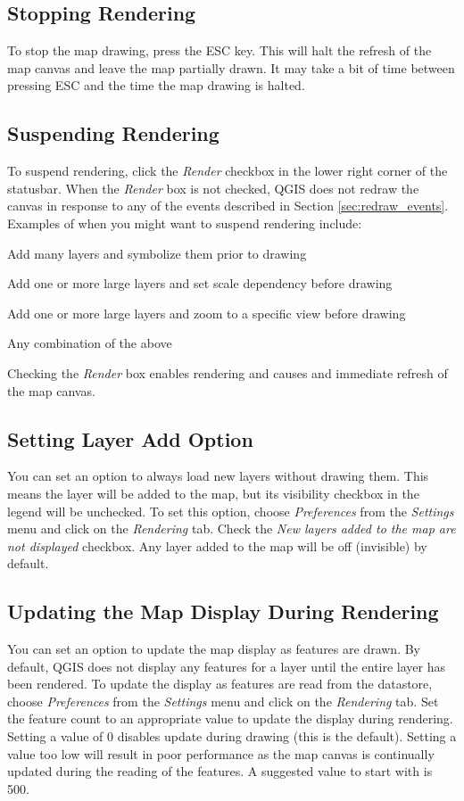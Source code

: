 \subsection{Stopping Rendering}
To stop the map drawing, press the ESC key. This will halt the refresh of the
map canvas and leave the map partially drawn. It may take a bit of time between
pressing ESC and the time the map drawing is halted.
\subsection{Suspending Rendering}
To suspend rendering, click the \textit{Render} checkbox in the lower right
corner of the statusbar. When the \textit{Render} box is not checked, QGIS does
not redraw the canvas in response to any of the events described in Section
\ref{sec:redraw_events}. Examples of when you might want to suspend rendering
include:
\begin{compactitem}
\item Add many layers and symbolize them prior to drawing
\item Add one or more large layers and set scale dependency before drawing
\item Add one or more large layers and zoom to a specific view before drawing
\item Any combination of the above
\end{compactitem}
Checking the \textit{Render} box enables rendering and causes and immediate
refresh of the map canvas.
\subsection{Setting Layer Add
Option}
You can set an option to always load new layers without drawing them. This means
the layer will be added to the map, but its visibility checkbox in the legend
will be unchecked. To set this option, choose \textit{Preferences} from the
\textit{Settings} menu and click on the \textit{Rendering} tab. Check the
\textit{New layers added to the map are not displayed} checkbox. Any layer added
to the map will be off (invisible) by default.
\subsection{Updating the Map Display During Rendering}
You can set an option to update the map display as features are drawn. By
default, QGIS does not display any features for a layer until the entire layer
has been rendered. To update the display as features are read from the
datastore, choose \textit{Preferences} from the
\textit{Settings} menu and click on the \textit{Rendering} tab. Set the feature
count to an appropriate value to update the display during rendering. Setting a
value of 0 disables update during drawing (this is the default). Setting a value
too low will result in poor performance as the map canvas is continually updated
during the reading of the features. A suggested value to start with is 500. 

